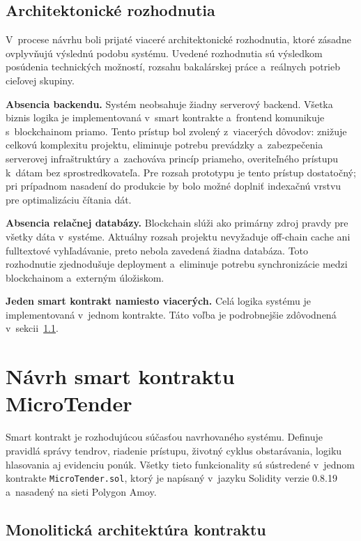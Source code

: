 \subsection{Architektonické rozhodnutia}
\label{subsec:architecture_decisions}

V~procese návrhu boli prijaté viaceré architektonické rozhodnutia, ktoré
zásadne ovplyvňujú výslednú podobu systému. Uvedené rozhodnutia sú výsledkom
posúdenia technických možností, rozsahu bakalárskej práce a~reálnych potrieb
cieľovej skupiny.

\textbf{Absencia backendu.} Systém neobsahuje žiadny serverový backend.
Všetka biznis logika je implementovaná v~smart kontrakte a~frontend komunikuje
s~blockchainom priamo. Tento prístup bol zvolený z~viacerých dôvodov: znižuje
celkovú komplexitu projektu, eliminuje potrebu prevádzky a~zabezpečenia
serverovej infraštruktúry a~zachováva princíp priameho, overiteľného
prístupu k~dátam bez sprostredkovateľa. Pre rozsah prototypu je tento prístup
dostatočný; pri prípadnom nasadení do produkcie by bolo možné doplniť indexačnú
vrstvu pre optimalizáciu čítania dát.

\textbf{Absencia relačnej databázy.} Blockchain slúži ako primárny zdroj
pravdy pre všetky dáta v~systéme. Aktuálny rozsah projektu nevyžaduje off-chain
cache ani fulltextové vyhľadávanie, preto nebola zavedená žiadna databáza.
Toto rozhodnutie zjednodušuje deployment a~eliminuje potrebu synchronizácie
medzi blockchainom a~externým úložiskom.

\textbf{Jeden smart kontrakt namiesto viacerých.} Celá logika systému je
implementovaná v~jednom kontrakte. Táto voľba je podrobnejšie zdôvodnená
v~sekcii~\ref{subsec:monolithic}.

\section{Návrh smart kontraktu MicroTender}
\label{sec:smart_contracts_design}

Smart kontrakt je rozhodujúcou súčasťou navrhovaného systému. Definuje pravidlá
správy tendrov, riadenie prístupu, životný cyklus obstarávania, logiku
hlasovania aj evidenciu ponúk. Všetky tieto funkcionality sú sústredené
v~jednom kontrakte \texttt{MicroTender.sol}, ktorý je napísaný v~jazyku Solidity
verzie 0.8.19 a~nasadený na sieti Polygon Amoy.

\subsection{Monolitická architektúra kontraktu}
\label{subsec:monolithic}

